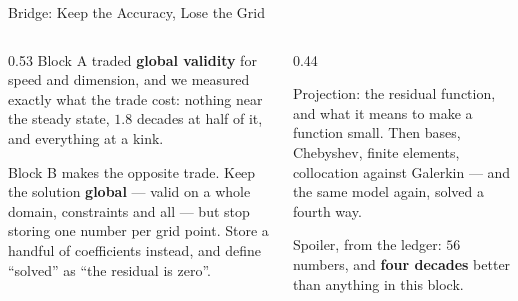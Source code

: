 \begin{frame}{Bridge: Keep the Accuracy, Lose the Grid}
\begin{columns}[T]
\begin{column}{0.53\textwidth}
\small
Block A traded \textbf{global validity} for speed and dimension, and we measured exactly what the trade cost: nothing near the steady state, $1.8$ decades at half of it, and everything at a kink.
\medskip

Block B makes the opposite trade. Keep the solution \textbf{global} --- valid on a whole domain, constraints and all --- but stop storing one number per grid point. Store a handful of coefficients instead, and define ``solved'' as ``the residual is zero''.
\end{column}
\begin{column}{0.44\textwidth}
\begin{conceptbox}[title=\textbf{After the break (5.B1)}]\small
Projection: the residual function, and what it means to make a function small. Then bases, Chebyshev, finite elements, collocation against Galerkin --- and the same model again, solved a fourth way.
\end{conceptbox}
\medskip
\begin{examplebox}\footnotesize
Spoiler, from the ledger: $56$ numbers, and \textbf{four decades} better than anything in this block.
\end{examplebox}
\end{column}
\end{columns}
\end{frame}


